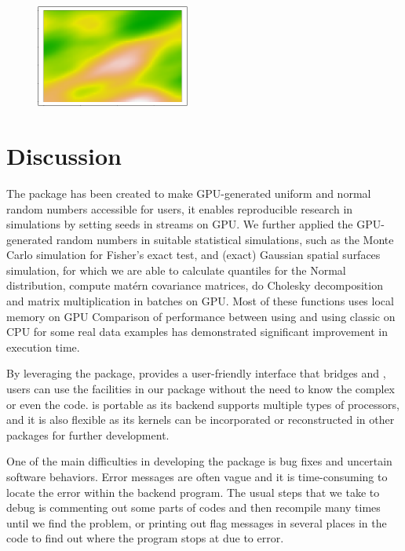 \documentclass[article,nojss]{jss}\usepackage[]{graphicx}\usepackage[]{color}
\newenvironment{knitrout}{}{} %
\begin{document}
\begin{figure}[H]
\begin{knitrout}
\includegraphics[width=0.45\textwidth]{figure/maternplot-10} 
\end{knitrout}
\caption{\label{fig:5} }
\end{figure}










\section{Discussion}
The package  has been created to make GPU-generated uniform and normal random numbers accessible for  users, it enables reproducible research in simulations by setting seeds in streams on GPU. We further applied the GPU-generated random numbers in suitable statistical simulations, such as the Monte Carlo simulation for Fisher’s exact test, and (exact) Gaussian spatial surfaces simulation, for which we are able to calculate quantiles for the Normal distribution, compute mat\'ern covariance matrices, do Cholesky decomposition and matrix multiplication in batches on GPU. Most of these functions uses local memory on GPU %
Comparison of performance between using  and using classic  on CPU for some real data examples has demonstrated significant improvement in execution time. 

By leveraging the  package,  provides a user-friendly interface that bridges  and , users can use the facilities in our package without the need to know the complex  or even the  code.   is portable as its backend  supports multiple types of processors, and it is also flexible as its kernels can be incorporated or reconstructed in other  packages for further development. 

One of the main difficulties in developing the package is bug fixes and uncertain software behaviors. Error messages are often vague and it is time-consuming to locate the error within the backend  program. The usual steps that we take to debug is commenting out some parts of codes and then recompile many times until we find the problem, or printing out flag messages in several places in the code to find out where the program stops at due to error. 
\end{document}
